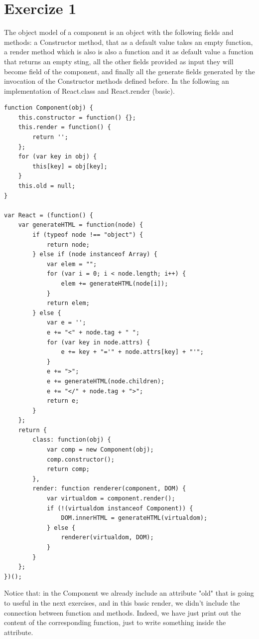 \documentclass[10pt]{article}
\begin{document}
\section*{Exercize 1}
The object model of a component is an object with the following fields and methods: a Constructor method, that as a default value takes an empty function, a render method which is also is also a function and it as default value a function that returns an empty sting, all the other fields provided as input they will become field of the component, and finally all the generate fields generated by the invocation of the Constructor methods defined before. In the following an implementation of React.class and React.render (basic). 
\begin{lstlisting}[caption=Simplest definition of react component and a basic render method]
function Component(obj) {
    this.constructor = function() {};
    this.render = function() {
        return '';
    };
    for (var key in obj) {
        this[key] = obj[key];
    }
    this.old = null;
}

var React = (function() {
    var generateHTML = function(node) {
        if (typeof node !== "object") {
            return node;
        } else if (node instanceof Array) {
            var elem = "";
            for (var i = 0; i < node.length; i++) {
                elem += generateHTML(node[i]);
            }
            return elem;
        } else {
            var e = '';
            e += "<" + node.tag + " ";
            for (var key in node.attrs) {
                e += key + "='" + node.attrs[key] + "'";
            }
            e += ">";
            e += generateHTML(node.children);
            e += "</" + node.tag + ">";
            return e;
        }
    };
    return {
        class: function(obj) {
            var comp = new Component(obj);
            comp.constructor();
            return comp;
        },
        render: function renderer(component, DOM) {
            var virtualdom = component.render();
            if (!(virtualdom instanceof Component)) {
                DOM.innerHTML = generateHTML(virtualdom);
            } else {
                renderer(virtualdom, DOM);
            }
        }
    };
})();
\end{lstlisting}
Notice that: in the Component we already include an attribute "old" that is going to useful in the next exercises, and in this basic render, we didn't include the connection between function and methods. Indeed, we have just print out the content of the corresponding function, just to write something inside the attribute.
\end{document}
